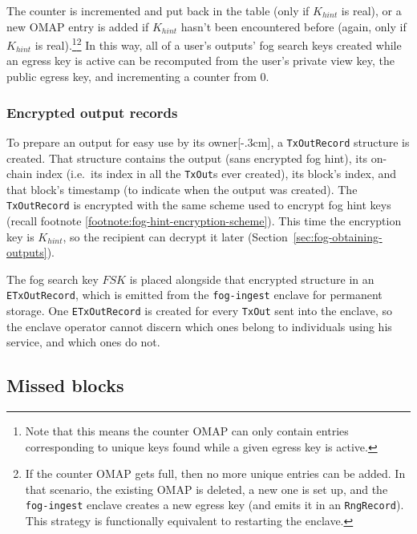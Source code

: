 The counter is incremented and put back in the table (only if $K_{hint}$ is real), or a new OMAP entry is added if $K_{hint}$ hasn't been encountered before (again, only if $K_{hint}$ is real).\footnote{Note that this means the counter OMAP can only contain entries corresponding to unique keys found while a given egress key is active.}\footnote{If the counter OMAP gets full, then no more unique entries can be added. In that scenario, the existing OMAP is deleted, a new one is set up, and the {\tt fog-ingest} enclave creates a new egress key (and emits it in an {\tt RngRecord}). This strategy is functionally equivalent to restarting the enclave.} In this way, all of a user's outputs' fog search keys created while an egress key is active can be recomputed from the user's private view key, the public egress key, and incrementing a counter from 0.

\subsubsection{Encrypted output records}

To prepare an output for easy use by its owner[-.3cm], a {\tt TxOutRecord} structure is created. That structure contains the output (sans encrypted fog hint), its on-chain index (i.e.\ its index in all the {\tt TxOut}s ever created), its block's index, and that block's timestamp (to indicate when the output was created). The {\tt TxOutRecord} is encrypted with the same scheme used to encrypt fog hint keys (recall footnote \ref{footnote:fog-hint-encryption-scheme}). This time the encryption key is $K_{hint}$, so the recipient can decrypt it later (Section~\ref{sec:fog-obtaining-outputs}).

The fog search key $FSK$ is placed alongside that encrypted structure in an {\tt ETxOutRecord}, which is emitted from the {\tt fog-ingest} enclave for permanent storage. One {\tt ETxOutRecord} is created for every {\tt TxOut} sent into the enclave, so the enclave operator cannot discern which ones belong to individuals using his service, and which ones do not.


\subsection{Missed blocks}
\label{subsec:fog-missed-blocks}

